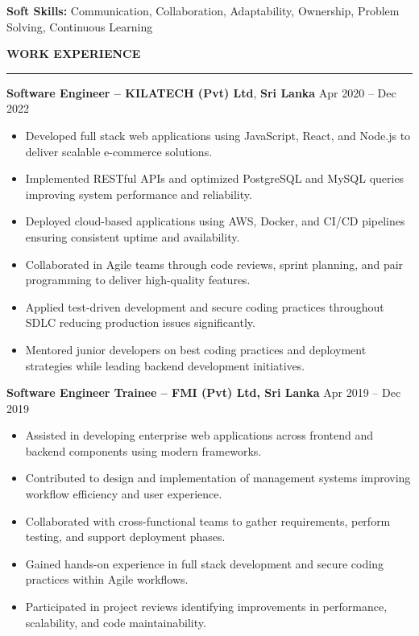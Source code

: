 \documentclass[10pt,letterpaper]{article}
\begin{document}
\textbf{Soft Skills:} Communication, Collaboration, Adaptability, Ownership, Problem Solving, Continuous Learning

\vspace{8pt}

\textbf{WORK EXPERIENCE}\\[-8pt]
\noindent\rule{\textwidth}{1pt}

\vspace{-2pt}

\textbf{Software Engineer -- KILATECH (Pvt) Ltd}, \textbf{Sri Lanka} \hfill Apr 2020 -- Dec 2022

\vspace{-1pt}

\begin{itemize}
\item Developed full stack web applications using JavaScript, React, and Node.js to deliver scalable e-commerce solutions.
\item Implemented RESTful APIs and optimized PostgreSQL and MySQL queries improving system performance and reliability.
\item Deployed cloud-based applications using AWS, Docker, and CI/CD pipelines ensuring consistent uptime and availability.
\item Collaborated in Agile teams through code reviews, sprint planning, and pair programming to deliver high-quality features.
\item Applied test-driven development and secure coding practices throughout SDLC reducing production issues significantly.
\item Mentored junior developers on best coding practices and deployment strategies while leading backend development initiatives.
\end{itemize}

\textbf{Software Engineer Trainee -- FMI (Pvt) Ltd, Sri Lanka} \hfill Apr 2019 -- Dec 2019

\vspace{-1pt}

\begin{itemize}
\item Assisted in developing enterprise web applications across frontend and backend components using modern frameworks.
\item Contributed to design and implementation of management systems improving workflow efficiency and user experience.
\item Collaborated with cross-functional teams to gather requirements, perform testing, and support deployment phases.
\item Gained hands-on experience in full stack development and secure coding practices within Agile workflows.
\item Participated in project reviews identifying improvements in performance, scalability, and code maintainability.
\end{itemize}
\end{document}
